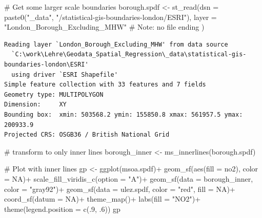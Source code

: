 \documentclass[
  letterpaper,
  DIV=11,
  numbers=noendperiod]{scrreprt}
\newenvironment{Shaded}{\begin{snugshade}}{\end{snugshade}}
\newcommand{\AttributeTok}[1]{\textcolor[rgb]{0.40,0.45,0.13}{#1}}
\newcommand{\CommentTok}[1]{\textcolor[rgb]{0.37,0.37,0.37}{#1}}
\newcommand{\ConstantTok}[1]{\textcolor[rgb]{0.56,0.35,0.01}{#1}}
\newcommand{\DecValTok}[1]{\textcolor[rgb]{0.68,0.00,0.00}{#1}}
\newcommand{\FunctionTok}[1]{\textcolor[rgb]{0.28,0.35,0.67}{#1}}
\newcommand{\NormalTok}[1]{\textcolor[rgb]{0.00,0.23,0.31}{#1}}
\newcommand{\OtherTok}[1]{\textcolor[rgb]{0.00,0.23,0.31}{#1}}
\newcommand{\SpecialCharTok}[1]{\textcolor[rgb]{0.37,0.37,0.37}{#1}}
\newcommand{\StringTok}[1]{\textcolor[rgb]{0.13,0.47,0.30}{#1}}
\begin{document}
\begin{Shaded}
\begin{Highlighting}[]
\CommentTok{\# Get some larger scale boundaries}
\NormalTok{borough.spdf }\OtherTok{\textless{}{-}} \FunctionTok{st\_read}\NormalTok{(}\AttributeTok{dsn =} \FunctionTok{paste0}\NormalTok{(}\StringTok{"\_data"}\NormalTok{, }\StringTok{"/statistical{-}gis{-}boundaries{-}london/ESRI"}\NormalTok{),}
                     \AttributeTok{layer =} \StringTok{"London\_Borough\_Excluding\_MHW"} \CommentTok{\# Note: no file ending}
\NormalTok{                     )}
\end{Highlighting}
\end{Shaded}

\begin{verbatim}
Reading layer `London_Borough_Excluding_MHW' from data source 
  `C:\work\Lehre\Geodata_Spatial_Regression\_data\statistical-gis-boundaries-london\ESRI' 
  using driver `ESRI Shapefile'
Simple feature collection with 33 features and 7 fields
Geometry type: MULTIPOLYGON
Dimension:     XY
Bounding box:  xmin: 503568.2 ymin: 155850.8 xmax: 561957.5 ymax: 200933.9
Projected CRS: OSGB36 / British National Grid
\end{verbatim}

\begin{Shaded}
\begin{Highlighting}[]
\CommentTok{\# transform to only inner lines}
\NormalTok{borough\_inner }\OtherTok{\textless{}{-}} \FunctionTok{ms\_innerlines}\NormalTok{(borough.spdf)}

\CommentTok{\# Plot with inner lines}
\NormalTok{gp }\OtherTok{\textless{}{-}} \FunctionTok{ggplot}\NormalTok{(msoa.spdf)}\SpecialCharTok{+}
    \FunctionTok{geom\_sf}\NormalTok{(}\FunctionTok{aes}\NormalTok{(}\AttributeTok{fill =}\NormalTok{ no2), }\AttributeTok{color =} \ConstantTok{NA}\NormalTok{)}\SpecialCharTok{+}
    \FunctionTok{scale\_fill\_viridis\_c}\NormalTok{(}\AttributeTok{option =} \StringTok{"A"}\NormalTok{)}\SpecialCharTok{+}
    \FunctionTok{geom\_sf}\NormalTok{(}\AttributeTok{data =}\NormalTok{ borough\_inner, }\AttributeTok{color =} \StringTok{"gray92"}\NormalTok{)}\SpecialCharTok{+}
    \FunctionTok{geom\_sf}\NormalTok{(}\AttributeTok{data =}\NormalTok{ ulez.spdf, }\AttributeTok{color =} \StringTok{"red"}\NormalTok{, }\AttributeTok{fill =} \ConstantTok{NA}\NormalTok{)}\SpecialCharTok{+}
    \FunctionTok{coord\_sf}\NormalTok{(}\AttributeTok{datum =} \ConstantTok{NA}\NormalTok{)}\SpecialCharTok{+}
    \FunctionTok{theme\_map}\NormalTok{()}\SpecialCharTok{+}
    \FunctionTok{labs}\NormalTok{(}\AttributeTok{fill =} \StringTok{"NO2"}\NormalTok{)}\SpecialCharTok{+}
    \FunctionTok{theme}\NormalTok{(}\AttributeTok{legend.position =} \FunctionTok{c}\NormalTok{(.}\DecValTok{9}\NormalTok{, .}\DecValTok{6}\NormalTok{))}
\NormalTok{gp}
\end{Highlighting}
\end{Shaded}
\end{document}
